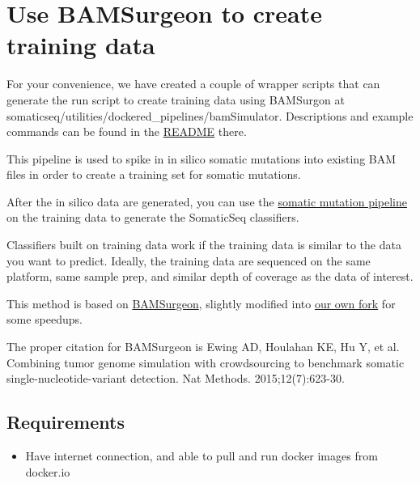 \documentclass[10pt,letterpaper]{article}
\begin{document}
\begin{sloppypar}
\begin{itemize}
\begin{itemize}
    \end{itemize}

\end{itemize}





\section{Use BAMSurgeon to create training data}

For your convenience, we have created a couple of wrapper scripts that can generate the run script to create training data using BAMSurgon at somaticseq/utilities/dockered\_pipelines/bamSimulator. Descriptions and example commands can be found in the \href{https://github.com/bioinform/somaticseq/tree/master/utilities/dockered_pipelines/bamSimulator}{README} there. 

This pipeline is used to spike in in silico somatic mutations into existing BAM files in order to create a training set for somatic mutations.

After the in silico data are generated, you can use the \href{https://github.com/bioinform/somaticseq/blob/master/utilities/dockered_pipelines}{somatic mutation pipeline} on the training data to generate the SomaticSeq classifiers.

Classifiers built on training data work if the training data is similar to the data you want to predict. Ideally, the training data are sequenced on the same platform, same sample prep, and similar depth of coverage as the data of interest.

This method is based on \href{https://github.com/adamewing/bamsurgeon}{BAMSurgeon}, slightly modified into \href{https://github.com/ltfang-bina/bamsurgeon}{our own fork} for some speedups.

The proper citation for BAMSurgeon is Ewing AD, Houlahan KE, Hu Y, et al. Combining tumor genome simulation with crowdsourcing to benchmark somatic single-nucleotide-variant detection. Nat Methods. 2015;12(7):623-30.


\subsection{Requirements}

\begin{itemize}

  \item Have internet connection, and able to pull and run docker images from docker.io


\end{itemize}
\end{sloppypar}
\end{document}
